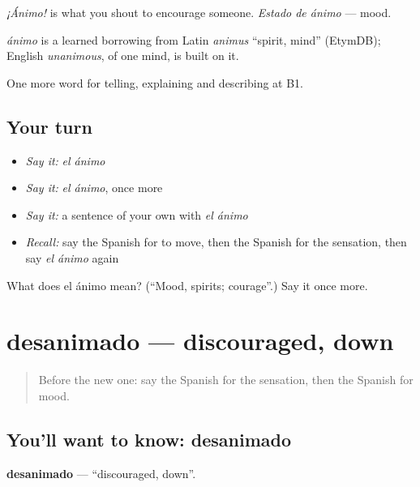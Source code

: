 \emph{¡Ánimo!} is what you shout to encourage someone. \emph{Estado de ánimo} — mood.

\begin{cousinweb}
\emph{ánimo} is a learned borrowing from Latin \emph{animus} \textquotedblleft{}spirit, mind\textquotedblright{} (EtymDB); English \emph{unanimous}, of one mind, is built on it.
\end{cousinweb}

\begin{grammarlens}[title={What you've built}]
One more word for telling, explaining and describing at B1.
\end{grammarlens}

\subsection*{Your turn}
\begin{itemize}
\raggedright
  \item \emph{Say it:} \emph{el ánimo}
  \item \emph{Say it:} \emph{el ánimo}, once more
  \item \emph{Say it:} a sentence of your own with \emph{el ánimo}
  \item \emph{Recall:} say the Spanish for to move, then the Spanish for the sensation, then say \emph{el ánimo} again
\end{itemize}

\begin{tcolorbox}[breakable,colback=teal!4,colframe=teal!35!black,title={Before you move on}]
What does el ánimo mean? (\textquotedblleft{}Mood, spirits; courage\textquotedblright{}.) Say it once more.
\end{tcolorbox}
\section[desanimado]{desanimado — discouraged, down}

\label{lesson:ES-C712-desanimado}



\begin{quote}
Before the new one: say the Spanish for the sensation, then the Spanish for mood.
\end{quote}

\subsection*{You'll want to know: desanimado}
\textbf{desanimado} — \textquotedblleft{}discouraged, down\textquotedblright{}.


